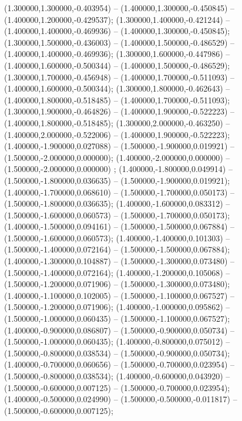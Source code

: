  (1.300000,1.300000,-0.403954) -- (1.400000,1.300000,-0.450845) -- (1.400000,1.200000,-0.429537);
 (1.300000,1.400000,-0.421244) -- (1.400000,1.400000,-0.469936) -- (1.400000,1.300000,-0.450845);
 (1.300000,1.500000,-0.436003) -- (1.400000,1.500000,-0.486529) -- (1.400000,1.400000,-0.469936);
 (1.300000,1.600000,-0.447986) -- (1.400000,1.600000,-0.500344) -- (1.400000,1.500000,-0.486529);
 (1.300000,1.700000,-0.456948) -- (1.400000,1.700000,-0.511093) -- (1.400000,1.600000,-0.500344);
 (1.300000,1.800000,-0.462643) -- (1.400000,1.800000,-0.518485) -- (1.400000,1.700000,-0.511093);
 (1.300000,1.900000,-0.464826) -- (1.400000,1.900000,-0.522223) -- (1.400000,1.800000,-0.518485);
 (1.300000,2.000000,-0.463250) -- (1.400000,2.000000,-0.522006) -- (1.400000,1.900000,-0.522223);
 (1.400000,-1.900000,0.027088) -- (1.500000,-1.900000,0.019921) -- (1.500000,-2.000000,0.000000);
 (1.400000,-2.000000,0.000000) -- (1.500000,-2.000000,0.000000) ;
 (1.400000,-1.800000,0.049914) -- (1.500000,-1.800000,0.036635) -- (1.500000,-1.900000,0.019921);
 (1.400000,-1.700000,0.068610) -- (1.500000,-1.700000,0.050173) -- (1.500000,-1.800000,0.036635);
 (1.400000,-1.600000,0.083312) -- (1.500000,-1.600000,0.060573) -- (1.500000,-1.700000,0.050173);
 (1.400000,-1.500000,0.094161) -- (1.500000,-1.500000,0.067884) -- (1.500000,-1.600000,0.060573);
 (1.400000,-1.400000,0.101303) -- (1.500000,-1.400000,0.072164) -- (1.500000,-1.500000,0.067884);
 (1.400000,-1.300000,0.104887) -- (1.500000,-1.300000,0.073480) -- (1.500000,-1.400000,0.072164);
 (1.400000,-1.200000,0.105068) -- (1.500000,-1.200000,0.071906) -- (1.500000,-1.300000,0.073480);
 (1.400000,-1.100000,0.102005) -- (1.500000,-1.100000,0.067527) -- (1.500000,-1.200000,0.071906);
 (1.400000,-1.000000,0.095862) -- (1.500000,-1.000000,0.060435) -- (1.500000,-1.100000,0.067527);
 (1.400000,-0.900000,0.086807) -- (1.500000,-0.900000,0.050734) -- (1.500000,-1.000000,0.060435);
 (1.400000,-0.800000,0.075012) -- (1.500000,-0.800000,0.038534) -- (1.500000,-0.900000,0.050734);
 (1.400000,-0.700000,0.060656) -- (1.500000,-0.700000,0.023954) -- (1.500000,-0.800000,0.038534);
 (1.400000,-0.600000,0.043920) -- (1.500000,-0.600000,0.007125) -- (1.500000,-0.700000,0.023954);
 (1.400000,-0.500000,0.024990) -- (1.500000,-0.500000,-0.011817) -- (1.500000,-0.600000,0.007125);
